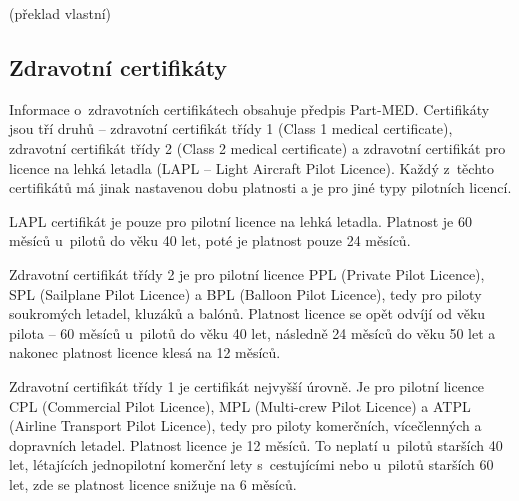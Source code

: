 \documentclass[thesis=M,czech]{FITthesis}[2012/06/26]
\begin{document}
 \cite{FTL} (překlad vlastní)

\subsection{Zdravotní certifikáty}
Informace o~zdravotních certifikátech obsahuje předpis Part-MED. Certifikáty jsou tří druhů -- zdravotní certifikát třídy 1 (Class 1 medical certificate), zdravotní certifikát třídy 2 (Class 2 medical certificate) a zdravotní certifikát pro licence na lehká letadla (LAPL -- Light Aircraft Pilot Licence). Každý z~těchto certifikátů má jinak nastavenou dobu platnosti a je pro jiné typy pilotních licencí.

LAPL certifikát je pouze pro pilotní licence na lehká letadla. Platnost je 60 měsíců u~pilotů do věku 40 let, poté je platnost pouze 24 měsíců.

Zdravotní certifikát třídy 2 je pro pilotní licence PPL (Private Pilot Licence), SPL (Sailplane Pilot Licence) a BPL (Balloon Pilot Licence), tedy pro piloty soukromých letadel, kluzáků a balónů. Platnost licence se opět odvíjí od věku pilota -- 60 měsíců u~pilotů do věku 40 let, následně 24 měsíců do věku 50 let a nakonec platnost licence klesá na 12 měsíců.

Zdravotní certifikát třídy 1 je certifikát nejvyšší úrovně. Je pro pilotní licence CPL (Commercial Pilot Licence), MPL (Multi-crew Pilot Licence) a ATPL (Airline Transport Pilot Licence), tedy pro piloty komerčních, vícečlenných a dopravních letadel. Platnost licence je 12 měsíců. To neplatí u~pilotů starších 40 let, létajících jednopilotní komerční lety s~cestujícími nebo u~pilotů starších 60 let, zde se platnost licence snižuje na 6 měsíců. \cite{CAA}
\end{document}
